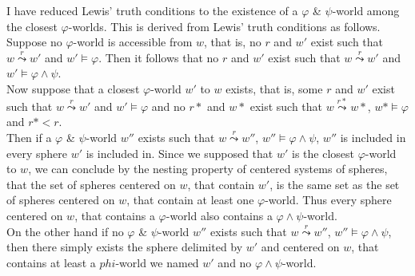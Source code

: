 \documentclass[a4paper,american]{paper}
\begin{document}
	I have reduced Lewis' truth conditions to the existence of a $\varphi$ \& $\psi$-world among the closest $\varphi$-worlds. This is derived from Lewis' truth conditions as follows. \\
	Suppose no $\varphi$-world is accessible from $w$, that is, no $r$ and $w'$ exist such that $w\overset{r}{\leadsto}w'$ and $w'\vDash\varphi$. Then it follows that no $r$ and $w'$ exist such that $w\overset{r}{\leadsto}w'$ and $w'\vDash\varphi\wedge\psi$. \\
	Now suppose that a closest $\varphi$-world $w'$ to $w$ exists, that is, some $r$ and $w'$ exist such that $w\overset{r}{\leadsto}w'$ and $w'\vDash\varphi$ and no $r*$ and $w*$ exist such that $w\overset{r*}{\leadsto}w*$, $w*\vDash\varphi$ and $r*<r$. \\
	Then if a $\varphi$ \& $\psi$-world $w''$ exists such that $w\overset{r}{\leadsto}w''$, $w''\vDash\varphi\wedge\psi$, $w''$ is included in every sphere $w'$ is included in. Since we supposed that $w'$ is the closest $\varphi$-world to $w$, we can conclude by the nesting property of centered systems of spheres, that the set of spheres centered on $w$, that contain $w'$, is the same set as the set of spheres centered on $w$, that contain at least one $\varphi$-world. Thus every sphere centered on $w$, that contains a $\varphi$-world also contains a $\varphi\wedge\psi$-world. \\
	On the other hand if no $\varphi$ \& $\psi$-world $w''$ exists such that $w\overset{r}{\leadsto}w''$, $w''\vDash\varphi\wedge\psi$, then there simply exists the sphere delimited by $w'$ and centered on $w$, that contains at least a $phi$-world we named $w'$ and no $\varphi\wedge\psi$-world. \\
	
\end{document}
